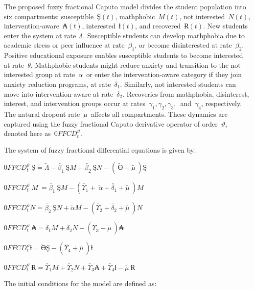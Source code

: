 \documentclass[10pt]{NSP1}
\begin{document}
The proposed fuzzy fractional Caputo model divides the student population into six compartments: susceptible \(Ş(t)\), mathphobic \(M(t)\), not interested \(N(t)\), intervention-aware \(₳(t)\), interested \(ƚ(t)\), and recovered \(Ɍ(t)\). New students enter the system at rate \(\Lambda\). Susceptible students can develop mathphobia due to academic stress or peer influence at rate \(\beta_{1}\), or become disinterested at rate \(\beta_{2}\). Positive educational exposure enables susceptible students to become interested at rate \(\theta\). Mathphobic students might reduce anxiety and transition to the not interested group at rate \(\alpha\) or enter the intervention-aware category if they join anxiety reduction programs, at rate \(\delta_{1}\). Similarly, not interested students can move into intervention-aware at rate \(\delta_{2}\). Recoveries from mathphobia, disinterest, interest, and intervention groups occur at rates \(\gamma_{1},\gamma_{2},\gamma_{3},\) and \(\gamma_{4}\), respectively. The natural dropout rate \(\mu\) affects all compartments. These dynamics are captured using the fuzzy fractional Caputo derivative operator of order \(\vartheta\), denoted here as \(0FFCD_{t}^{\vartheta}\).

The system of fuzzy fractional differential equations is given by:

\(0FFCD_{t}^{\vartheta}\ Ş = \widetilde{\Lambda} - \widetilde{\beta_{1}}\ ŞM - \widetilde{\beta_{2}}\ ŞN - \left( \ \widetilde{Ө} + \widetilde{\mu\ } \right)Ş\)

\(0FFCD_{t}^{\vartheta}\ M\ = \widetilde{\beta_{1}}\ ŞM - \left( \widetilde{\Upsilon_{1}} + \ \widetilde{\alpha} + \widetilde{\delta_{1}} + \widetilde{\mu\ } \right)M\)

\(0FFCD_{t}^{\vartheta}N = \widetilde{\beta_{2}}\ ŞN + \widetilde{\alpha}M - \left( \widetilde{\Upsilon_{2}} + \widetilde{\delta_{2}} + \widetilde{\mu\ } \right)N\)

\(0FFCD_{t}^{\vartheta}\ ₳ = \widetilde{\delta_{1}}M + \widetilde{\delta_{2}}N - \left( \widetilde{\Upsilon_{3}} + \widetilde{\mu\ } \right)₳\)

\(0FFCD_{t}^{\vartheta}ƚ = \widetilde{Ө}Ş - \left( \widetilde{\Upsilon_{4}} + \widetilde{\mu\ } \right)ƚ\)

\(0FFCD_{t}^{\vartheta}\ Ɍ = \widetilde{\Upsilon_{1}}M + \widetilde{\Upsilon_{2}}N + \widetilde{\Upsilon_{3}}₳ + \widetilde{\Upsilon_{4}}ƚ - \widetilde{\mu\ }Ɍ\)

The initial conditions for the model are defined as:
\end{document}
